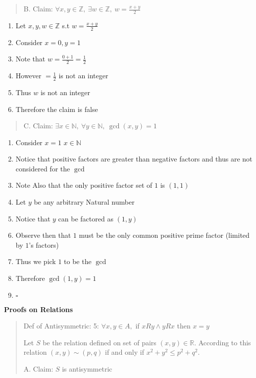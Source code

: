 \documentclass[12pt]{article}
\begin{document}
\begin{enumerate}
  \begin{quote}
  \item B. Claim: $\forall x,y \in \mathbb{Z},\ \exists w\in
    \mathbb{Z},\ w = \frac{x+y}{2}$
  \end{quote}

  \begin{enumerate}
  \item Let $x,y,w \in \mathbb{Z}$ s.t $ w = \frac{x+y}{2}$
  \item Consider $x=0,y=1$
  \item Note that $w = \frac{0+1}{2} = \frac{1}{2}$
  \item However $ = \frac{1}{2}$ is not an integer
  \item Thus $w$ is not an integer
  \item Therefore the claim is false
  \end{enumerate}

  \begin{quote}
  \item C. Claim: $\exists x \in \mathbb{N}, \ \forall y \in
    \mathbb{N},\ \gcd(x,y)=1$
  \end{quote}

  \begin{enumerate}
  \item Consider $x = 1$ $x\in\mathbb{N}$
  \item Notice that positive factors are greater than negative factors and thus are not considered for the $\gcd$
  \item Note Also that the only positive factor set of $1$ is $(1,1)$
  \item Let $y$ be any arbitrary Natural number
  \item Notice that $y$ can be factored as $(1,y)$
  \item Observe then that $1$ must be the only common positive prime factor (limited by $1$'s factors)
  \item Thus we pick $1$ to be the $\gcd$
  \item Therefore $\gcd(1,y) = 1$
  \item $\square$
  \end{enumerate}
  \newpage
\item \textbf{Proofs on Relations}


  \begin{quote}
  \item Def of Antisymmetric: 5: $\forall x,y \in A,$ if $xRy \wedge yRx$ then $x=y$
  \item Let $S$ be the relation defined on set of pairs $(x,y) \in
    \mathbb{R}$. According to this relation $(x,y) \sim (p,q)$ if and
    only if $x^2+y^2 \leq p^2+q^2$.
  \item A. Claim: $S$ is antisymmetric
  \end{quote}


\end{enumerate}
\end{document}
